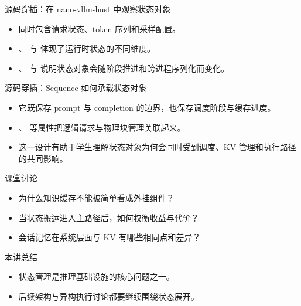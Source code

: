 \begin{frame}{源码穿插：在 nano-vllm-hust 中观察状态对象}
  \begin{itemize}
    \item \texttt{} 同时包含请求状态、token 序列和采样配置。
    \item \texttt{}、\texttt{} 与 \texttt{} 体现了运行时状态的不同维度。
    \item \texttt{}、\texttt{} 与 \texttt{} 说明状态对象会随阶段推进和跨进程序列化而变化。
  \end{itemize}
\end{frame}

\begin{frame}{源码穿插：Sequence 如何承载状态对象}
  \begin{itemize}
    \item 它既保存 prompt 与 completion 的边界，也保存调度阶段与缓存进度。
    \item \texttt{}、\texttt{} 等属性把逻辑请求与物理块管理关联起来。
    \item 这一设计有助于学生理解状态对象为何会同时受到调度、KV 管理和执行路径的共同影响。
  \end{itemize}
\end{frame}



\begin{frame}{课堂讨论}
  \begin{itemize}
    \item 为什么知识缓存不能被简单看成外挂组件？
    \item 当状态搬运进入主路径后，如何权衡收益与代价？
    \item 会话记忆在系统层面与 KV 有哪些相同点和差异？
  \end{itemize}
\end{frame}

\begin{frame}{本讲总结}
  \begin{itemize}
    \item 状态管理是推理基础设施的核心问题之一。
    \item 后续架构与异构执行讨论都要继续围绕状态展开。
  \end{itemize}
\end{frame}

